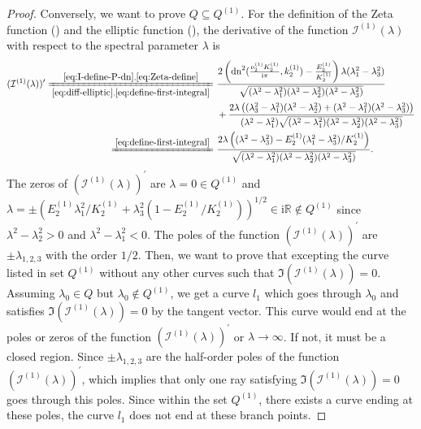 \documentclass[11pt,reqno]{amsart}
\newcommand{\ii}{\mathrm{i}}
\newcommand{\dn}{\mathrm{dn}}
\numberwithin{equation}{section}
\begin{document}
\begin{proof}
	Conversely, we want to prove $Q\subseteq Q^{(1)}$.
	For the definition of the Zeta function () and the elliptic function (), the derivative of the function $\mathcal{I}^{(1)}(\lambda)$ with respect to the spectral parameter $\lambda$ is
	\begin{equation}\nonumber
		\begin{split}
			(\mathcal{I}^{(1)}(\lambda))^{\prime}
			 \xlongequal[\eqref{eq:diff-elliptic},\eqref{eq:define-first-integral}]{\eqref{eq:I-define-P-dn}, \eqref{eq:Zeta-define}}&\ \frac{2\left(\dn^2(\frac{ \nu^{(1)} _2  K^{(1)}_2}{\ii \pi},  k^{(1)}_2)-\frac{ E^{(1)}_2}{  K^{(1)}_2}\right)\lambda(\lambda_1^2-\lambda_3^2)}{\sqrt{(\lambda^2-\lambda_1^2)(\lambda^2-\lambda_2^2)(\lambda^2-\lambda_3^2)}}\\
			 &\ +\frac{2\lambda\left((\lambda_3^2-\lambda_1^2)(\lambda^2-\lambda_2^2)+(\lambda^2-\lambda_1^2)(\lambda^2-\lambda_3^2)\right)}{(\lambda^2-\lambda_1^2)\sqrt{(\lambda^2-\lambda_1^2)(\lambda^2-\lambda_2^2)(\lambda^2-\lambda_3^2)}}\\
			\xlongequal{\eqref{eq:define-first-integral}}&\ \frac{2 \lambda \left((\lambda^2-\lambda_3^2)- E^{(1)}_2(\lambda_1^2-\lambda_3^2)/  K^{(1)}_2
				\right) }{\sqrt{(\lambda^2-\lambda_1^2)(\lambda^2-\lambda_2^2)(\lambda^2-\lambda_3^2)}}.
		\end{split}
	\end{equation}
	The zeros of $(\mathcal{I}^{(1)}(\lambda))^{\prime}$ are $\lambda=0\in  Q^{(1)} $ and $\lambda=\pm ( E^{(1)}_2\lambda_1^2/  K^{(1)}_2+\lambda_3^2(1- E^{(1)}_2/  K^{(1)}_2))^{1/2}\in \ii \mathbb{R}\notin  Q^{(1)} $ since $\lambda^2-\lambda_2^2>0$ and $\lambda^2-\lambda_1^2<0$.
	The poles of the function $(\mathcal{I}^{(1)}(\lambda))^{\prime}$ are $\pm \lambda_{1,2,3}$ with the order $1/2$. 
	Then, we want to prove that excepting the curve listed in set $ Q^{(1)} $ without any other curves such that $\Im(\mathcal{I}^{(1)}(\lambda))=0$. 
	Assuming $\lambda_0 \in Q$ but $\lambda_0 \notin  Q^{(1)} $, we get a curve $l_1$ which goes through $\lambda_0$ and satisfies ${\Im}(\mathcal{I}^{(1)}(\lambda))=0$ by the tangent vector. 
	This curve would end at the poles or zeros of the function $(\mathcal{I}^{(1)}(\lambda))^{\prime}$ or $\lambda \rightarrow \infty$. If not, it must be a closed region.
	Since $\pm \lambda_{1,2,3}$  are the half-order poles of the function $(\mathcal{I}^{(1)}(\lambda))^{\prime}$, which implies that only one ray satisfying ${\Im}(\mathcal{I}^{(1)}(\lambda))=0$ goes through this poles. 
	Since within the set $ Q^{(1)} $, there exists a curve ending at these poles, the curve $l_1$ does not end at these branch points.

\end{proof}
\end{document}
